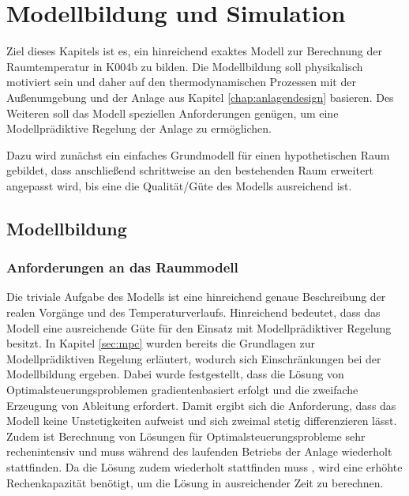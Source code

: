 %
%

\renewcommand{\chapterheadstartvskip}{\vspace*{2cm}}

\chapter{Modellbildung und Simulation}
\label{chap:modellbildung}

Ziel dieses Kapitels ist es, ein hinreichend exaktes Modell zur Berechnung der Raumtemperatur in K004b zu bilden. Die Modellbildung soll physikalisch motiviert sein und daher auf den thermodynamischen Prozessen mit der Außenumgebung und der Anlage aus Kapitel \ref{chap:anlagendesign} basieren. Des Weiteren soll das Modell speziellen Anforderungen genügen, um eine Modellprädiktive Regelung der Anlage zu ermöglichen.

Dazu wird zunächst ein einfaches Grundmodell für einen hypothetischen Raum gebildet, dass anschließend schrittweise an den bestehenden Raum erweitert angepasst wird, bis eine die Qualität/Güte des Modells ausreichend ist.

\section{Modellbildung}

\subsection{Anforderungen an das Raummodell}
Die triviale Aufgabe des Modells ist eine hinreichend genaue Beschreibung der realen Vorgänge und des Temperaturverlaufs. Hinreichend bedeutet, dass das Modell eine ausreichende Güte für den Einsatz mit Modellprädiktiver Regelung besitzt. In Kapitel \ref{sec:mpc} wurden bereits die Grundlagen zur Modellprädiktiven Regelung erläutert, wodurch sich Einschränkungen bei der Modellbildung ergeben. Dabei wurde festgestellt, dass die Lösung von Optimalsteuerungsproblemen gradientenbasiert erfolgt und die zweifache Erzeugung von Ableitung erfordert. Damit ergibt sich die Anforderung, dass das Modell keine Unstetigkeiten aufweist und sich zweimal stetig differenzieren lässt.
Zudem ist Berechnung von Lösungen für Optimalsteuerungsprobleme sehr rechenintensiv und muss während des laufenden Betriebs der Anlage wiederholt stattfinden. Da die Lösung zudem wiederholt stattfinden muss
, wird eine erhöhte Rechenkapazität benötigt, 
um die Lösung in ausreichender Zeit zu berechnen. 

